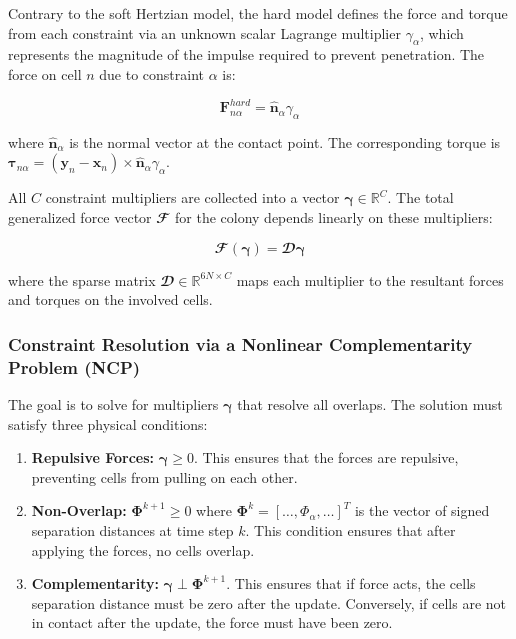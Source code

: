 \documentclass[conference]{IEEEtran}
\begin{document}
Contrary to the soft Hertzian model, the hard model defines the force and torque from each constraint via an unknown scalar Lagrange multiplier $\gamma_\alpha$, which represents the magnitude of the impulse required to prevent penetration. The force on cell $n$ due to constraint $\alpha$ is:

\begin{equation} \label{eq:constraint_force}
    \mathbf{F}^{hard}_{n\alpha} = \hat{\mathbf{n}}_\alpha \gamma_\alpha
\end{equation}

where $\hat{\mathbf{n}}_\alpha$ is the normal vector at the contact point. The corresponding torque is $\boldsymbol{\tau}_{n\alpha} = (\mathbf{y}_n - \mathbf{x}_n) \times \hat{\mathbf{n}}_\alpha \gamma_\alpha$.

All $C$ constraint multipliers are collected into a vector $\boldsymbol{\gamma} \in \mathbb{R}^{C}$. The total generalized force vector $\mathbfcal{F}$ for the colony depends linearly on these multipliers:

\begin{equation}
    \mathbfcal{F}(\boldsymbol{\gamma}) = \mathbfcal{D} \boldsymbol{\gamma}
\end{equation}

where the sparse matrix $\mathbfcal{D} \in \mathbb{R}^{6N \times C}$ maps each multiplier to the resultant forces and torques on the involved cells.

\subsubsection{Constraint Resolution via a Nonlinear Complementarity Problem (NCP)}

The goal is to solve for multipliers $\boldsymbol{\gamma}$ that resolve all overlaps. The solution must satisfy three physical conditions:

\begin{enumerate}
    \item \textbf{Repulsive Forces:} $\boldsymbol{\gamma} \geq 0$. This ensures that the forces are repulsive, preventing cells from pulling on each other.
    \item \textbf{Non-Overlap:} $\mathbf{\Phi}^{k+1} \geq 0$ where $\mathbf{\Phi}^k = [\dots, \Phi_\alpha, \dots]^T$ is the vector of signed separation distances at time step $k$. This condition ensures that after applying the forces, no cells overlap.
    \item   \textbf{Complementarity:} $\boldsymbol{\gamma} \perp \mathbf{\Phi}^{k+1}$. This ensures  that if force acts, the cells separation distance must be zero after the update. Conversely, if cells are not in contact after the update, the force must have been zero.
\end{enumerate}
\end{document}
